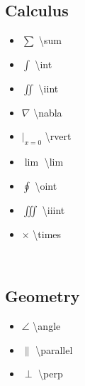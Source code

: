 \subsection*{Calculus}

\begin{minipage}{3cm}
\begin{itemize}[label={}]
    \item $\sum$ \textbackslash sum
    \item $\int$ \textbackslash int 
    \item $\iint$ \textbackslash iint 
    \item $\nabla$ \textbackslash nabla 
    \item $\rvert_{x=0}$ \textbackslash rvert
\end{itemize} 
\end{minipage}
\begin{minipage}{3cm}
\begin{itemize}[label={}]
    \item $\lim$ \textbackslash lim
    \item $\oint$ \textbackslash oint 
    \item $\iiint$ \textbackslash iiint 
    \item $\times$ \textbackslash times
\end{itemize} 
\end{minipage}\ \\



\subsection*{Geometry}

\begin{minipage}{3cm}
\begin{itemize}[label={}]
    \item  $\angle$ \textbackslash angle
    \item $\parallel$ \textbackslash parallel
\end{itemize} 
\end{minipage}
\begin{minipage}{3cm}
\begin{itemize}[label={}]
    \item $\perp$ \textbackslash perp 
\end{itemize} 
\end{minipage} \\


